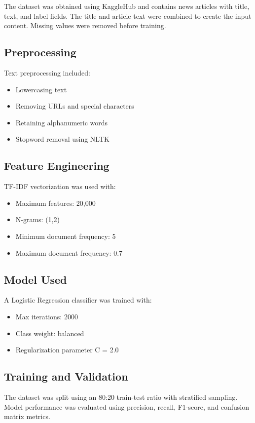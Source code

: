 \documentclass[conference]{IEEEtran}
\begin{document}
The dataset was obtained using KaggleHub and contains news
articles with title, text, and label fields. The title and
article text were combined to create the input content.
Missing values were removed before training.

\subsection{Preprocessing}

Text preprocessing included:
\begin{itemize}
\item Lowercasing text
\item Removing URLs and special characters
\item Retaining alphanumeric words
\item Stopword removal using NLTK
\end{itemize}

\subsection{Feature Engineering}

TF-IDF vectorization was used with:
\begin{itemize}
\item Maximum features: 20,000
\item N-grams: (1,2)
\item Minimum document frequency: 5
\item Maximum document frequency: 0.7
\end{itemize}

\subsection{Model Used}

A Logistic Regression classifier was trained with:
\begin{itemize}
\item Max iterations: 2000
\item Class weight: balanced
\item Regularization parameter C = 2.0
\end{itemize}

\subsection{Training and Validation}

The dataset was split using an 80:20 train-test ratio with
stratified sampling. Model performance was evaluated using
precision, recall, F1-score, and confusion matrix metrics.
\end{document}
